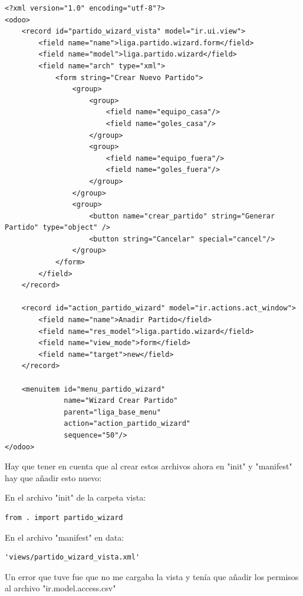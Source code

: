 \documentclass[a4paper,12pt]{article}
\begin{document}
\vspace{0.5cm}
\begin{lstlisting}[style=javascript]
<?xml version="1.0" encoding="utf-8"?>
<odoo>
    <record id="partido_wizard_vista" model="ir.ui.view">
        <field name="name">liga.partido.wizard.form</field>
        <field name="model">liga.partido.wizard</field>
        <field name="arch" type="xml">
            <form string="Crear Nuevo Partido">
                <group>
                    <group>
                        <field name="equipo_casa"/>
                        <field name="goles_casa"/>
                    </group>
                    <group>
                        <field name="equipo_fuera"/>
                        <field name="goles_fuera"/>
                    </group>
                </group>
                <group>
                    <button name="crear_partido" string="Generar Partido" type="object" />
                    <button string="Cancelar" special="cancel"/>
                </group>
            </form>
        </field>
    </record>

    <record id="action_partido_wizard" model="ir.actions.act_window">
        <field name="name">Anadir Partido</field>
        <field name="res_model">liga.partido.wizard</field>
        <field name="view_mode">form</field>
        <field name="target">new</field> 
    </record>

    <menuitem id="menu_partido_wizard" 
              name="Wizard Crear Partido" 
              parent="liga_base_menu" 
              action="action_partido_wizard" 
              sequence="50"/>
</odoo>
\end{lstlisting}

Hay que tener en cuenta que al crear estos archivos ahora en "init" y "manifest" hay que añadir esto nuevo:

En el archivo "init" de la carpeta vista: 
\vspace{0.5cm}
\begin{lstlisting}[style=javascript]
    from . import partido_wizard
\end{lstlisting}

En el archivo "manifest" en data:
\vspace{0.5cm}
\begin{lstlisting}[style=javascript]
    'views/partido_wizard_vista.xml'
\end{lstlisting}

Un error que tuve fue que no me cargaba la vista y tenía que añadir los permisos al archivo "ir.model.access.csv"
\end{document}
